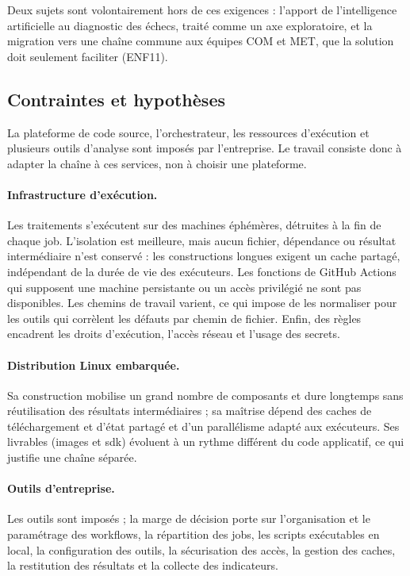 Deux sujets sont volontairement hors de ces exigences : l'apport de
l'intelligence artificielle au diagnostic des échecs, traité comme un axe
exploratoire, et la migration vers une chaîne commune aux équipes COM et MET,
que la solution doit seulement faciliter (ENF11).

\subsection{Contraintes et hypothèses}

La plateforme de code source, l'orchestrateur, les ressources d'exécution et
plusieurs outils d'analyse sont imposés par l'entreprise. Le travail consiste
donc à adapter la chaîne à ces services, non à choisir une plateforme.

\paragraph{Infrastructure d'exécution.}
\label{sssec:bes-contraintes-infra}
Les traitements s'exécutent sur des machines éphémères, détruites à la fin de
chaque job. L'isolation est meilleure, mais aucun fichier, dépendance ou
résultat intermédiaire n'est conservé : les constructions longues exigent un
cache partagé, indépendant de la durée de vie des exécuteurs. Les fonctions de
GitHub Actions qui supposent une machine persistante ou un accès privilégié ne
sont pas disponibles. Les chemins de travail varient, ce qui impose de les
normaliser pour les outils qui corrèlent les défauts par chemin de fichier.
Enfin, des règles encadrent les droits d'exécution, l'accès réseau et
l'usage des secrets.

\paragraph{Distribution Linux embarquée.} Sa construction mobilise un grand
nombre de composants et dure longtemps sans réutilisation des résultats
intermédiaires ; sa maîtrise dépend des caches de téléchargement et d'état
partagé et d'un parallélisme adapté aux exécuteurs. Ses livrables (images et
\gls{sdk}) évoluent à un rythme différent du code applicatif, ce qui justifie
une chaîne séparée.

\paragraph{Outils d'entreprise.} Les outils sont imposés ; la marge de décision
porte sur l'organisation et le paramétrage des workflows, la répartition des
jobs, les scripts exécutables en local, la configuration des outils, la
sécurisation des accès, la gestion des caches, la restitution des résultats et
la collecte des indicateurs.

